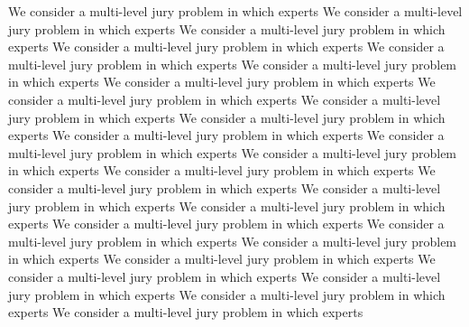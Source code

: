 \documentclass[letterpaper]{article} %
\begin{document}



We consider a multi-level jury problem in which experts
We consider a multi-level jury problem in which experts
We consider a multi-level jury problem in which experts
We consider a multi-level jury problem in which experts
We consider a multi-level jury problem in which experts
We consider a multi-level jury problem in which experts
We consider a multi-level jury problem in which experts
We consider a multi-level jury problem in which experts
We consider a multi-level jury problem in which experts
We consider a multi-level jury problem in which experts
We consider a multi-level jury problem in which experts
We consider a multi-level jury problem in which experts
We consider a multi-level jury problem in which experts
We consider a multi-level jury problem in which experts
We consider a multi-level jury problem in which experts
We consider a multi-level jury problem in which experts
We consider a multi-level jury problem in which experts
We consider a multi-level jury problem in which experts
We consider a multi-level jury problem in which experts
We consider a multi-level jury problem in which experts
We consider a multi-level jury problem in which experts
We consider a multi-level jury problem in which experts
We consider a multi-level jury problem in which experts
We consider a multi-level jury problem in which experts
We consider a multi-level jury problem in which experts
\clearpage

\end{document}
